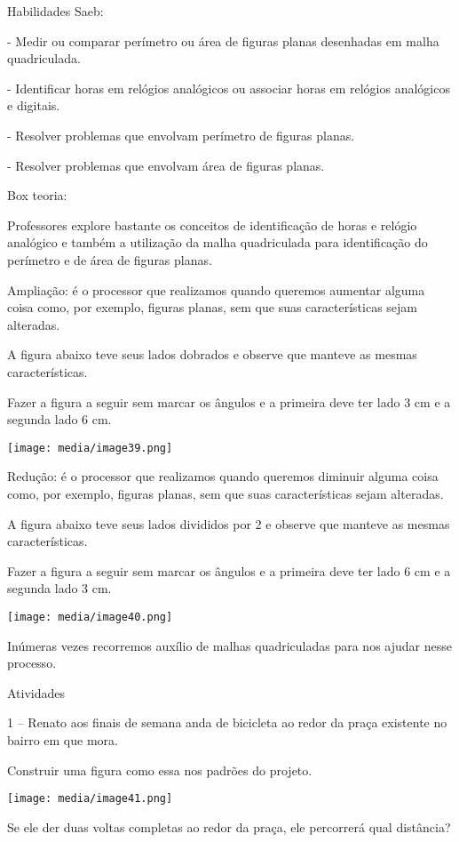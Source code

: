 Habilidades Saeb:

- Medir ou comparar perímetro ou área de figuras planas desenhadas em
malha quadriculada.

- Identificar horas em relógios analógicos ou associar horas em relógios
analógicos e digitais.

- Resolver problemas que envolvam perímetro de figuras planas.

- Resolver problemas que envolvam área de figuras planas.

Box teoria:

Professores explore bastante os conceitos de identificação de horas e
relógio analógico e também a utilização da malha quadriculada para
identificação do perímetro e de área de figuras planas.

Ampliação: é o processor que realizamos quando queremos aumentar alguma
coisa como, por exemplo, figuras planas, sem que suas características
sejam alteradas.

A figura abaixo teve seus lados dobrados e observe que manteve as mesmas
características.

Fazer a figura a seguir sem marcar os ângulos e a primeira deve ter lado
3 cm e a segunda lado 6 cm.

\texttt{[image: media/image39.png]}

Redução: é o processor que realizamos quando queremos diminuir alguma
coisa como, por exemplo, figuras planas, sem que suas características
sejam alteradas.

A figura abaixo teve seus lados divididos por 2 e observe que manteve as
mesmas características.

Fazer a figura a seguir sem marcar os ângulos e a primeira deve ter lado
6 cm e a segunda lado 3 cm.

\texttt{[image: media/image40.png]}

Inúmeras vezes recorremos auxílio de malhas quadriculadas para nos
ajudar nesse processo.

Atividades

1 -- Renato aos finais de semana anda de bicicleta ao redor da praça
existente no bairro em que mora.

Construir uma figura como essa nos padrões do projeto.

\texttt{[image: media/image41.png]}

Se ele der duas voltas completas ao redor da praça, ele percorrerá qual
distância?

